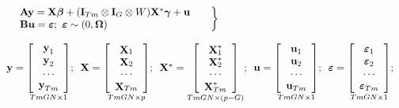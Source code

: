 \documentclass[article]{jss}
\begin{document}
\begin{equation}
 \begin{array}{l} \left. \begin{array}{l} {\, \begin{array}{ll} {\bf Ay}={\bf X}{\boldsymbol \beta} +({\bf I}_{Tm} \otimes {\bf I}_{G} \otimes {W}) {\bf X}^* {\boldsymbol \gamma}+{\bf u} & {} \\ {{\bf Bu}={\boldsymbol \varepsilon};\, \, {{\boldsymbol \varepsilon} \sim (0,{\boldsymbol \Omega })} } \end{array}} \end{array}\right\} \\ {} \\

  {\bf y}=\mathop{\left[\begin{array}{c} {\mathop{{\bf y}}\nolimits_{1} } \\ {\mathop{{\bf y}}\nolimits_{2} } \\ {\cdots } \\ {\mathop{{\bf y}}\nolimits_{Tm} } \end{array}\right]}\limits_{TmGN\times1} ;

  \, \, \, {\bf X}=\mathop{\left[\begin{array}{c} {\mathop{{\bf X}}\nolimits_{1} } \\ {\mathop{{\bf X}}\nolimits_{2} } \\ {\cdots } \\ {\mathop{{\bf X}}\nolimits_{Tm} } \end{array}\right]}\limits_{TmGN\times p} ;

 \, \, \, {\bf X}^*=\mathop{\left[\begin{array}{c} {\mathop{\bf X}^*_{1}} \\ {\mathop{\bf X}^*_{2}} \\ {\cdots } \\ {\mathop{\bf X}^*_{Tm}} \end{array}\right]}\limits_{TmGN\times (p-G)} ;

  \, \, \, {\bf u}=\mathop{\left[\begin{array}{c} {\mathop{{\bf u}}\nolimits_{1} } \\ {\mathop{{\bf u}}\nolimits_{2} } \\ {\cdots } \\ {\mathop{{\bf u}}\nolimits_{Tm} } \end{array}\right]}\limits_{TmGN\times 1} ;

 \, \, \, {\boldsymbol \varepsilon}  =\mathop{\left[\begin{array}{c} {\mathop{{\boldsymbol \varepsilon}}\nolimits_{1} } \\ {\mathop{{\boldsymbol \varepsilon}}\nolimits_{2} } \\ {\cdots } \\ {\mathop{{\boldsymbol \varepsilon}}\nolimits_{Tm} } \end{array}\right]}\limits_{TmGN\times 1};\\ {} \\


\end{array}
\end{equation}
\end{document}
